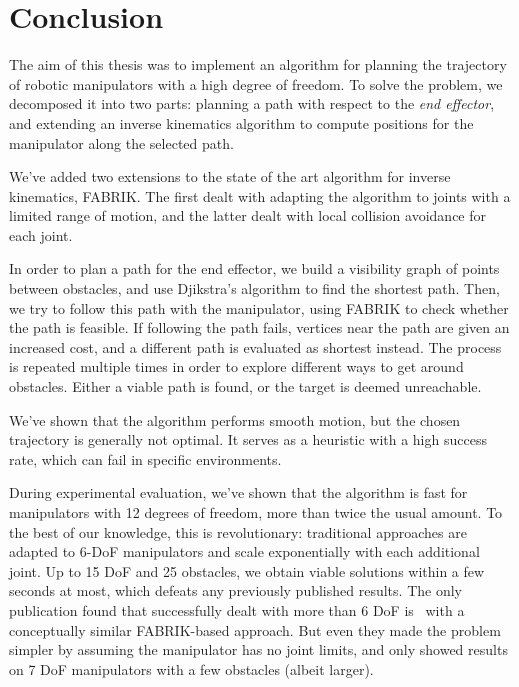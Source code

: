 \chapter{Conclusion}

The aim of this thesis was to implement an algorithm for planning the trajectory of robotic manipulators with a high degree of freedom. To solve the problem, we decomposed it into two parts: planning a path with respect to the \textit{end effector}, and extending an inverse kinematics algorithm to compute positions for the manipulator along the selected path.

We've added two extensions to the state of the art algorithm for inverse kinematics, FABRIK. The first dealt with adapting the algorithm to joints with a limited range of motion, and the latter dealt with local collision avoidance for each joint.

In order to plan a path for the end effector, we build a visibility graph of points between obstacles, and use Djikstra's algorithm to find the shortest path. Then, we try to follow this path with the manipulator, using FABRIK to check whether the path is feasible. If following the path fails, vertices near the path are given an increased cost, and a different path is evaluated as shortest instead. The process is repeated multiple times in order to explore different ways to get around obstacles. Either a viable path is found, or the target is deemed unreachable.

We've shown that the algorithm performs smooth motion, but the chosen trajectory is generally not optimal. It serves as a heuristic with a high success rate, which can fail in specific environments.

During experimental evaluation, we've shown that the algorithm is fast for manipulators with 12 degrees of freedom, more than twice the usual amount. To the best of our knowledge, this is revolutionary: traditional approaches are adapted to 6-DoF manipulators and scale exponentially with each additional joint. Up to 15 DoF and 25 obstacles, we obtain viable solutions within a few seconds at most, which defeats any previously published results. The only publication found that successfully dealt with more than 6 DoF is~\cite{rrt_fabrik} with a conceptually similar FABRIK-based approach. But even they made the problem simpler by assuming the manipulator has no joint limits, and only showed results on 7 DoF manipulators with a few obstacles (albeit larger).


